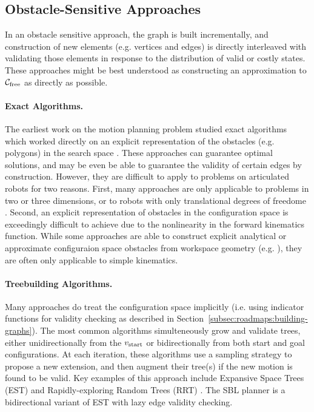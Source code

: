 \subsection{Obstacle-Sensitive Approaches}
\label{subsec:roadmaps:sensitive}

In an obstacle sensitive approach,
the graph is built incrementally,
and construction of new elements (e.g. vertices and edges)
is directly interleaved with validating those elements
in response to the distribution of valid or costly states.
These approaches might be best understood
as constructing an approximation to $\mathcal{C}_{\mbox{\scriptsize free}}$
as directly as possible.

\paragraph{Exact Algorithms.}
The earliest work on the motion planning problem studied exact
algorithms which worked directly on an explicit representation
of the obstacles (e.g. polygons) in the search space
\citep{lozanoperez1983cspace}.
These approaches can guarantee optimal solutions,
and may be even be able to guarantee the validity of certain edges
by construction.
However,
they are difficult to apply to problems on articulated
robots for two reasons.
First, many approaches are only applicable to problems
in two or three dimensions,
or to robots with only translational degrees of freedome
\citep{kavraki1995cspacefft}.
Second, an explicit representation of obstacles in the
configuration space is exceedingly difficult to achieve due to the
nonlinearity in the forward kinematics function.
While some approaches are able to construct explicit
analytical or approximate configuraion space obstacles from
workspace geometry (e.g. \citep{newmanbranicky1991cspacetransforms}),
they are often only applicable to simple kinematics.

\paragraph{Treebuilding Algorithms.}
Many approaches do treat the configuration space implicitly
(i.e. using indicator functions for validity checking as described
in Section~\ref{subsec:roadmaps:building-graphs}).
The most common algorithms simulteneously grow and validate trees,
either unidirectionally from the $v_{\mbox{\scriptsize start}}$ or bidirectionally
from both start and goal configurations.
At each iteration,
these algorithms use a sampling strategy to propose a new extension,
and then augment their tree(s) if the new motion is found to be valid.
Key examples of this approach include
Expansive Space Trees (EST) \citep{hsu1997expansive}
and Rapidly-exploring Random Trees (RRT)
\citep{lavalle1998rrt, kuffner2000rrtconnect}.
The SBL planner \citep{sanchezante2001sbl}
is a bidirectional variant of EST with lazy edge validity checking.


